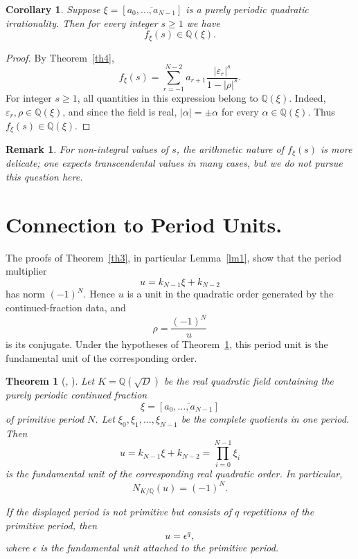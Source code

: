 \documentclass[]{interact}
\theoremstyle{plain}
\numberwithin{equation}{section} %
\newtheorem{theorem}[thm]{Theorem}
\newtheorem{corollary}[thm]{Corollary}
\newtheorem{remark}[thm]{Remark}
\numberwithin{table}{section} %
\numberwithin{figure}{section}
\begin{document}
\begin{corollary}
Suppose \(\xi=[\overline{a_0,\dots,a_{N-1}}]\) is a purely periodic quadratic
irrationality. Then for every integer \(s\ge1\) we have
\[
f_\xi(s)\in\mathbb Q(\xi).
\]
\end{corollary}

\begin{proof}
By Theorem~\ref{th4},
\[
f_\xi(s)
=
\sum_{r=-1}^{N-2}
a_{r+1}\frac{|\varepsilon_r|^s}{1-|\rho|^s}.
\]
For integer \(s\ge1\), all quantities in this expression belong to
\(\mathbb Q(\xi)\). Indeed, \(\varepsilon_r,\rho\in\mathbb Q(\xi)\), and since
the field is real, \(|\alpha|=\pm\alpha\) for every \(\alpha\in\mathbb Q(\xi)\).
Thus \(f_\xi(s)\in\mathbb Q(\xi)\).
\end{proof}



\begin{remark}
For non-integral values of \(s\), the arithmetic nature of \(f_\xi(s)\) is more
delicate; one expects transcendental values in many cases, but we do not pursue
this question here.
\end{remark}


\section{Connection to Period Units.}\label{s3} 
The proofs of Theorem~\ref{th3}, in particular Lemma~\ref{lm1}, show that the
period multiplier
\[
u=k_{N-1}\xi+k_{N-2}
\]
has norm \((-1)^N\). Hence \(u\) is a unit in the quadratic order generated by
the continued-fraction data, and
\[
\rho=\frac{(-1)^N}{u}
\]
is its conjugate. Under the hypotheses of Theorem~\ref{th_unit}, this period
unit is the fundamental unit of the corresponding order.


\begin{theorem}[\cite{halter2013quadratic}, \cite{trifkovic2013algebraic}]
\label{th_unit}
Let \(K=\mathbb Q(\sqrt D)\) be the real quadratic field containing the
purely periodic continued fraction
\[
\xi=[\overline{a_0,\dots,a_{N-1}}]
\]
of primitive period \(N\). Let \(\xi_0,\xi_1,\dots,\xi_{N-1}\) be the complete
quotients in one period. Then
\[
u=k_{N-1}\xi+k_{N-2}
=
\prod_{i=0}^{N-1}\xi_i
\]
is the fundamental unit of the corresponding real quadratic order. In
particular,
\[
N_{K/\mathbb Q}(u)=(-1)^N.
\]

If the displayed period is not primitive but consists of \(q\) repetitions of
the primitive period, then
\[
u=\epsilon^q,
\]
where \(\epsilon\) is the fundamental unit attached to the primitive period.
\end{theorem}
\end{document}
